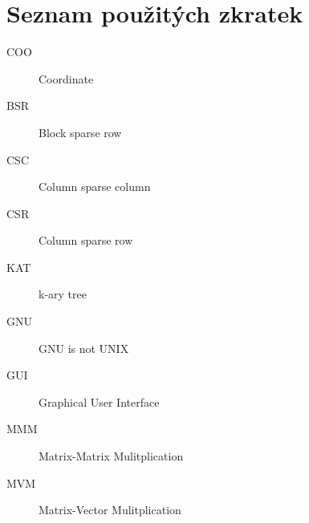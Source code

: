 \documentclass[thesis=B,czech]{FITthesis}[2012/06/26]
\begin{document}
\chapter{Seznam použitých zkratek}
\begin{description}
	\item[COO] Coordinate
	\item[BSR] Block sparse row
	\item[CSC] Column sparse column
	\item[CSR] Column sparse row
	\item[KAT] k-ary tree
	\item[GNU] GNU is not UNIX
	\item[GUI] Graphical User Interface
	\item[MMM] Matrix-Matrix Mulitplication
	\item[MVM] Matrix-Vector Mulitplication
\end{description}

\nopagebreak[4]
\nopagebreak[4]

\listoffigures

\nopagebreak[4]
\nopagebreak[4]

\listofalgorithms*

\nopagebreak[4]
\nopagebreak[4]
\end{document}
